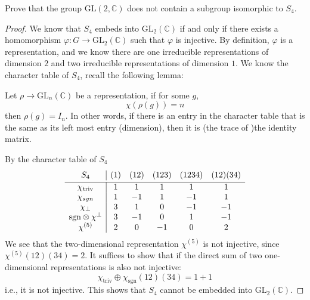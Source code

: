 \documentclass[openany]{book}
\newcommand{\C}{\mathbb{C}}
\begin{document}
\begin{prob}
    Prove that the group \(\text{GL}(2,\mathbb{C})\) does not contain a subgroup isomorphic to \(S_4\).
\end{prob}
\begin{proof}
    We know that $S_4$ embeds into $\text{GL}_2(\C)$ if and only if there exists a homomorphism $\varphi:G\to\text{GL}_2(\C)$ such that $\varphi$ is injective. By definition, $\varphi$ is a representation, and we know there are one irreducible representations of dimension $2$ and two irreducible representations of dimension $1$. We know the character table of $S_4$, recall the following lemma:
    \begin{lem}
        Let $\rho\to\text{GL}_n(\C)$ be a representation, if for some $g$,
        \begin{equation*}
            \chi(\rho(g))=n
        \end{equation*}
        then $\rho(g)=I_n$. In other words, if there is an entry in the character table that is the same as its left most entry (dimension), then it is (the trace of )the identity matrix. 
    \end{lem}
    By the character table of $S_4$
    \[
\begin{array}{c|ccccc}
S_4 & (1) & (12) & (123) & (1234) & (12)(34) \vspace{2pt} \\
\hline
\chi_{\text{triv}} & 1 & 1 & 1 & 1 & 1 \\

\chi_{sgn}  & 1 & -1 & 1 & -1 & 1 \\
\chi_\perp & 3 & 1 & 0 & -1 & -1 \\
\text{sgn}\otimes\chi^\perp & 3 & -1 & 0 & 1 & -1 \\
\chi^{(5)} & 2 & 0 & -1 & 0 & 2 \\
\end{array}
\]
    We see that the two-dimensional representation $\chi^{(5)}$ is not injective, since $\chi^{(5)}(12)(34)=2$. It suffices to show that if the direct sum of two one-dimensional representations is also not injective: 
    \begin{equation*}
        \chi_{\text{triv}}\oplus\chi_{\text{sgn}}(12)(34)=1+1
    \end{equation*}
    i.e., it is not injective. This shows that $S_4$ cannot be embedded into $\text{GL}_2(\C)$.
\end{proof}
\end{document}
